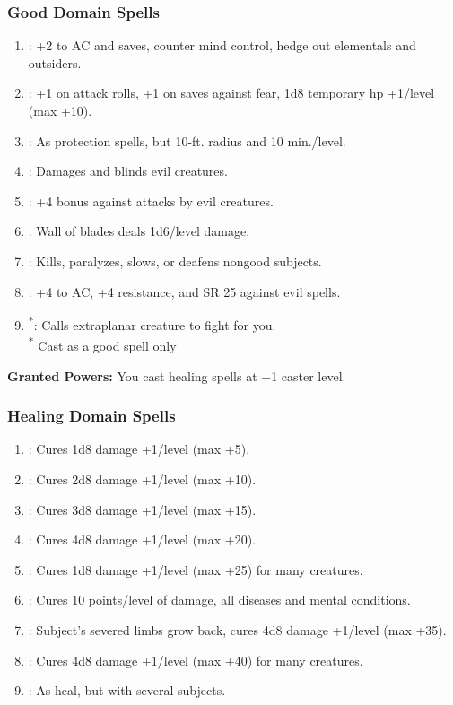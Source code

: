 \subsubsection{Good Domain Spells}
\begin{enumerate}
	\item{:} +2 to AC and saves, counter mind control, hedge out elementals and outsiders.
	\item{:} +1 on attack rolls, +1 on saves against fear, 1d8 temporary hp +1/level (max +10).
	\item{:} As protection spells, but 10-ft. radius and 10 min./level.
	\item{:} Damages and blinds evil creatures.
	\item{:} +4 bonus against attacks by evil creatures.
	\item{:} Wall of blades deals 1d6/level damage.
	\item{:} Kills, paralyzes, slows, or deafens nongood subjects.
	\item{:} +4 to AC, +4 resistance, and SR 25 against evil spells.
	\item{\textsuperscript{*}:} Calls extraplanar creature to fight for you.
	\\ \textsuperscript{*} Cast as a good spell only
\end{enumerate}

\textbf{Granted Powers:} You cast healing spells at +1 caster level.
\subsubsection{Healing Domain Spells}
\begin{enumerate}
	\item{:} Cures 1d8 damage +1/level (max +5).
	\item{:} Cures 2d8 damage +1/level (max +10).
	\item{:} Cures 3d8 damage +1/level (max +15).
	\item{:} Cures 4d8 damage +1/level (max +20).
	\item{:} Cures 1d8 damage +1/level (max +25) for many creatures.
	\item{:} Cures 10 points/level of damage, all diseases and mental conditions.
	\item{:} Subject’s severed limbs grow back, cures 4d8 damage +1/level (max +35).
	\item{:} Cures 4d8 damage +1/level (max +40) for many creatures.
	\item{:} As heal, but with several subjects.
\end{enumerate}

